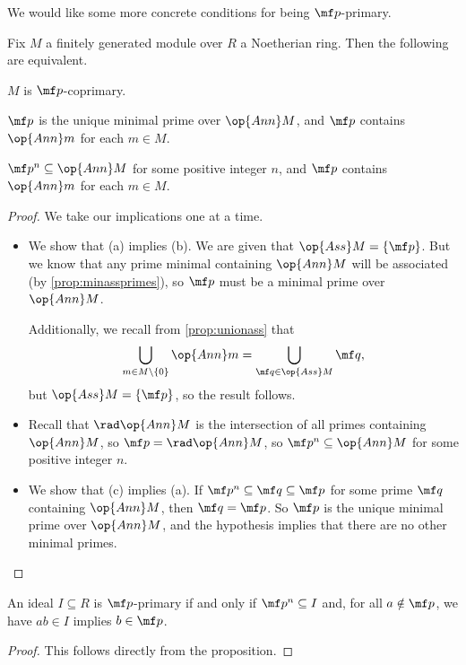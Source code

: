 We would like some more concrete conditions for being $\mf p$-primary.
\begin{proposition}
	Fix $M$ a finitely generated module over $R$ a Noetherian ring. Then the following are equivalent.
	\begin{listalph}
		\item $M$ is $\mf p$-coprimary.
		\item $\mf p$ is the unique minimal prime over $\op{Ann}M$, and $\mf p$ contains $\op{Ann}m$ for each $m\in M$. %
		\item $\mf p^n\subseteq\op{Ann}M$ for some positive integer $n$, and $\mf p$ contains $\op{Ann}m$ for each $m\in M$.
	\end{listalph}
\end{proposition}
\begin{proof}
	We take our implications one at a time.
	\begin{itemize}
		\item We show that (a) implies (b). We are given that $\op{Ass}M=\{\mf p\}$. But we know that any prime minimal containing $\op{Ann}M$ will be associated (by \autoref{prop:minassprimes}), so $\mf p$ must be a minimal prime over $\op{Ann}M$.

		Additionally, we recall from \autoref{prop:unionass} that
		\[\bigcup_{m\in M\setminus\{0\}}\op{Ann}m=\bigcup_{\mf q\in\op{Ass}M}\mf q,\]
		but $\op{Ass}M=\{\mf p\}$, so the result follows.

		\item Recall that $\rad\op{Ann}M$ is the intersection of all primes containing $\op{Ann}M$, so $\mf p=\rad\op{Ann}M$, so $\mf p^n\subseteq\op{Ann}M$ for some positive integer $n$.

		\item We show that (c) implies (a). If $\mf p^n\subseteq\mf q\subseteq\mf p$ for some prime $\mf q$ containing $\op{Ann}M$, then $\mf q=\mf p$. So $\mf p$ is the unique minimal prime over $\op{Ann}M$, and the hypothesis implies that there are no other minimal primes.
		\qedhere
	\end{itemize}
\end{proof}
\begin{corollary}
	An ideal $I\subseteq R$ is $\mf p$-primary if and only if $\mf p^n\subseteq I$ and, for all $a\notin\mf p$, we have $ab\in I$ implies $b\in\mf p$.
\end{corollary}
\begin{proof}
	This follows directly from the proposition.
\end{proof}

